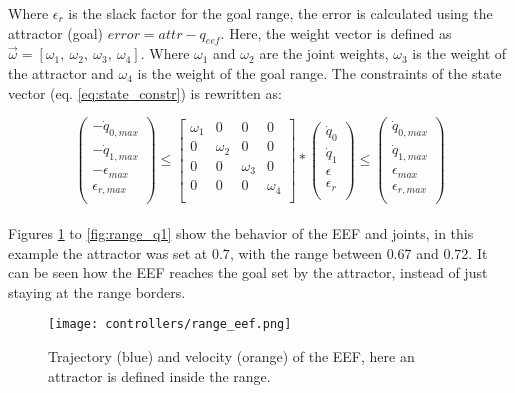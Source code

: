 Where $\epsilon_r$ is the slack factor for the goal range, the error is calculated using the attractor (goal) $error = attr - q_{eef}$. Here, the weight vector is defined as $\vec{\omega} = [ \omega_{1},\ \omega_{2},\ \omega_{3},\ \omega_{4} ]$. Where $\omega_{1}$ and $\omega_{2}$ are the joint weights, $\omega_{3}$ is the weight of the attractor and $\omega_{4}$ is the weight of the goal range. The constraints of the state vector (eq. \ref{eq:state_constr}) is rewritten as:

$$
\left( \begin{array}{c}
-\dot{q}_{0,max} \\
-\dot{q}_{1,max} \\
-\epsilon_{max} \\
\epsilon_{r,max} \\
\end{array}
\right)	\leq 
\left[ \begin{array}{cccc}
\omega_{1} & 0 & 0 & 0 \\
0 & \omega_{2} & 0 & 0 \\
0 & 0 & \omega_{3} & 0 \\
0 & 0 & 0 & \omega_{4} \\
\end{array}
\right] *
\left( \begin{array}{c}
\dot{q}_{0} \\
\dot{q}_{1} \\
\epsilon \\
\epsilon_r \\
\end{array}
\right) 
\leq \left( \begin{array}{c}
\dot{q}_{0,max} \\
\dot{q}_{1,max} \\
\epsilon_{max} \\
\epsilon_{r,max} \\
\end{array}
\right)
$$
\\
Figures \ref{fig:range_eef} to \ref{fig:range_q1} show the behavior of the EEF and joints, in this example the attractor was set at $0.7$, with the range between $0.67$ and $0.72$. It can be seen how the EEF reaches the goal set by the attractor, instead of just staying at the range borders. 
\begin{figure}[H]
	\centering
	\texttt{[image: controllers/range\_eef.png]}
	\vspace{-10pt}
	\caption[Position range with attractor: EEF]{Trajectory (blue) and velocity (orange) of the EEF, here an attractor is defined inside the range.}
	\vspace{-15pt}
	\label{fig:range_eef}
\end{figure}
